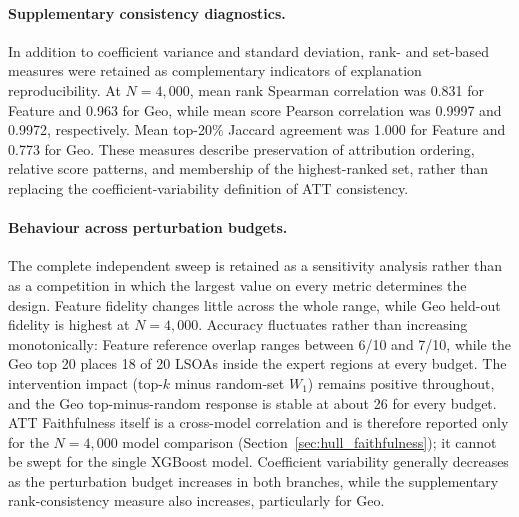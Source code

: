 \paragraph{Supplementary consistency diagnostics.}
In addition to coefficient variance and standard deviation, rank- and
set-based measures were retained as complementary indicators of explanation
reproducibility. At $N=4{,}000$, mean rank Spearman correlation was 0.831 for
Feature and 0.963 for Geo, while mean score Pearson correlation was 0.9997 and
0.9972, respectively. Mean top-20\% Jaccard agreement was 1.000 for Feature and
0.773 for Geo. These measures describe preservation of attribution ordering,
relative score patterns, and membership of the highest-ranked set, rather than
replacing the coefficient-variability definition of ATT consistency.

\paragraph{Behaviour across perturbation budgets.}
The complete independent sweep is retained as a sensitivity analysis rather
than as a competition in which the largest value on every metric determines
the design. Feature fidelity changes little across the whole range, while Geo
held-out fidelity is highest at $N=4{,}000$. Accuracy fluctuates rather than
increasing monotonically: Feature reference overlap ranges between 6/10 and
7/10, while the Geo top 20 places 18 of 20 LSOAs inside the expert regions at
every budget.
The intervention impact (top-$k$ minus random-set $W_1$) remains positive
throughout, and the Geo top-minus-random response is stable at about 26 for
every budget. ATT Faithfulness itself is a cross-model correlation and is
therefore reported only for the $N=4{,}000$ model comparison
(Section~\ref{sec:hull_faithfulness}); it cannot be swept for the single XGBoost model. Coefficient variability
generally decreases as the perturbation budget increases in both branches,
while the supplementary rank-consistency measure also increases, particularly
for Geo.

